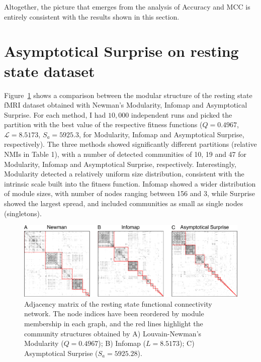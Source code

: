 Altogether, the picture that emerges from the analysis of Accuracy and MCC is entirely consistent with the results shown in this section.

\section{Asymptotical Surprise on resting state dataset}
Figure~\ref{fig:partitioncomparison} shows a comparison between the modular structure of the resting state fMRI dataset obtained with Newman's Modularity, Infomap and Asymptotical Surprise.
For each method, I had $10,000$ independent runs and picked the partition with the best value of the respective fitness functions ($Q=0.4967$, $\mathcal{L}=8.5173$, $S_a=5925.3$, for Modularity, Infomap and Asymptotical Surprise, respectively).
The three methods showed significantly different partitions (relative NMIs in Table 1), with a number of detected communities of 10, 19 and 47 for Modularity, Infomap and Asymptotical Surprise, respectively.
Interestingly, Modularity detected a relatively uniform size distribution, consistent with the intrinsic scale built into the fitness function.
Infomap showed a wider distribution of module sizes, with number of nodes ranging between 156 and 3, while Surprise showed the largest spread, and included communities as small as single nodes (singletons).
\begin{figure}[!htb]
\includegraphics[width=\textwidth]{images/pacopaperfigure6.pdf}
\caption{Adjacency matrix of the resting state functional connectivity network. The node indices have been reordered by module membership in each graph, and the red lines highlight the community structures obtained by A) Louvain-Newman's Modularity ($Q=0.4967$); B) Infomap ($L=8.5173$); C) Asymptotical Surprise ($S_a=5925.28$).}
\label{fig:partitioncomparison}
\end{figure}


